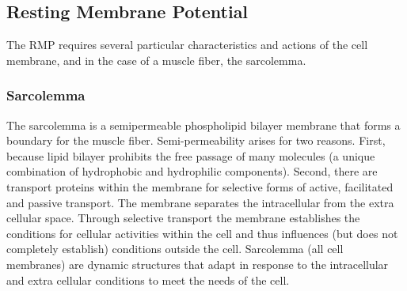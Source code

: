 \subsection{Resting Membrane Potential}

The RMP requires several particular characteristics and actions of the cell membrane, and in the case of a muscle fiber, the sarcolemma.

\subsubsection{Sarcolemma}


The sarcolemma is a semipermeable phospholipid bilayer membrane that forms a boundary for the muscle fiber. Semi-permeability arises for two reasons. First, because lipid bilayer prohibits the free passage of many molecules (a unique combination of hydrophobic and hydrophilic components). Second, there are transport proteins within the membrane for selective forms of active, facilitated and passive transport.\footnotemark{} The membrane separates the intracellular from the extra cellular space. Through selective transport the membrane establishes the conditions for cellular activities within the cell and thus influences (but does not completely establish) conditions outside the cell. Sarcolemma (all cell membranes) are dynamic structures that adapt in response to the intracellular and extra cellular conditions to meet the needs of the cell.


